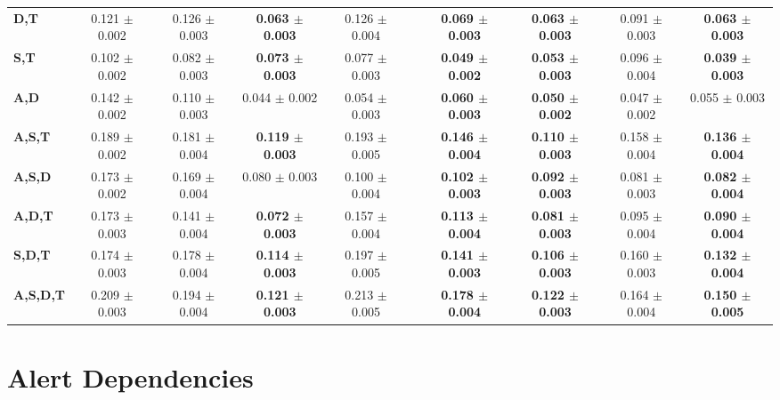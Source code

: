\begin{table}[!htbp]
\begin{adjustbox}{angle=90}
\begin{tabular}{l|c|c|c|c|c|c|c|c|c|}
			\textbf{D,T} & 0.121 $\pm$ 0.002 & 0.126 $\pm$ 0.003 & \textbf{0.063 $\pm$ 0.003} & 0.126 $\pm$ 0.004 &  & \textbf{0.069 $\pm$ 0.003} & \textbf{0.063 $\pm$ 0.003} & 0.091  $\pm$ 0.003 & \textbf{0.063 $\pm$ 0.003} \\
			\textbf{S,T} & 0.102 $\pm$ 0.002 & 0.082 $\pm$ 0.003 & \textbf{0.073 $\pm$ 0.003} & 0.077 $\pm$ 0.003 &  & \textbf{0.049 $\pm$ 0.002} & \textbf{0.053 $\pm$ 0.003} & 0.096  $\pm$ 0.004 & \textbf{0.039 $\pm$ 0.003} \\
			\textbf{A,D} & 0.142 $\pm$ 0.002 & 0.110 $\pm$ 0.003 & 0.044 $\pm$ 0.002 & 0.054 $\pm$ 0.003 &  & \textbf{0.060 $\pm$ 0.003} & \textbf{0.050 $\pm$ 0.002} & 0.047  $\pm$ 0.002 & 0.055 $\pm$ 0.003 \\ \hline
			\textbf{A,S,T} & 0.189 $\pm$ 0.002 & 0.181 $\pm$ 0.004 & \textbf{0.119 $\pm$ 0.003} & 0.193 $\pm$ 0.005 &  & \textbf{0.146 $\pm$ 0.004} & \textbf{0.110 $\pm$ 0.003} & 0.158  $\pm$ 0.004 & \textbf{0.136 $\pm$ 0.004} \\
			\textbf{A,S,D} & 0.173 $\pm$ 0.002 & 0.169 $\pm$ 0.004 & 0.080 $\pm$ 0.003 & 0.100 $\pm$ 0.004 &  & \textbf{0.102 $\pm$ 0.003} & \textbf{0.092 $\pm$ 0.003} & 0.081  $\pm$ 0.003 & \textbf{0.082 $\pm$ 0.004} \\
			\textbf{A,D,T} & 0.173 $\pm$ 0.003 & 0.141 $\pm$ 0.004 & \textbf{0.072 $\pm$ 0.003} & 0.157 $\pm$ 0.004 &  & \textbf{0.113 $\pm$ 0.004} & \textbf{0.081 $\pm$ 0.003} & 0.095  $\pm$ 0.004 & \textbf{0.090 $\pm$ 0.004} \\
			\textbf{S,D,T} & 0.174 $\pm$ 0.003 & 0.178 $\pm$ 0.004 & \textbf{0.114 $\pm$ 0.003} & 0.197 $\pm$ 0.005 &  & \textbf{0.141 $\pm$ 0.003} & \textbf{0.106 $\pm$ 0.003} & 0.160  $\pm$ 0.003 & \textbf{0.132 $\pm$ 0.004} \\ \hline
			\textbf{A,S,D,T} & 0.209 $\pm$ 0.003 & 0.194 $\pm$ 0.004 & \textbf{0.121 $\pm$ 0.003} & 0.213 $\pm$ 0.005 &  & \textbf{0.178 $\pm$ 0.004} & \textbf{0.122 $\pm$ 0.003} & 0.164  $\pm$ 0.004 & \textbf{0.150 $\pm$ 0.005} \\
		\end{tabular}
	\end{adjustbox}
\end{table}


\section{Alert Dependencies}
\label{sec:depend}

